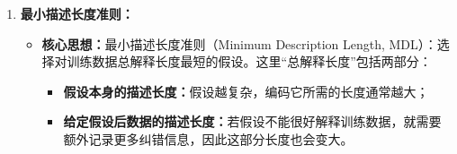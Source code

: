 \documentclass[../main.tex]{subfiles}
\begin{document}
\begin{enumerate}
\begin{itemize}
    {\small\kaishu
    设训练集为
    $$
    D=\{\langle x_1,d_1\rangle,\ldots,\langle x_m,d_m\rangle\}
    $$
    且每个训练值满足
    $$
    d_i=f(x_i)+e_i
    $$
    其中噪声 $e_i$ 相互独立，并服从均值为 $0$、方差为 $\sigma^2$ 的正态分布：
    $$
    e_i\sim N(0,\sigma^2)
    $$
    若各假设先验概率相同，则
    $$
    h_{\mathrm{ML}}=\arg\max_{h\in H}P(D\mid h)
    $$
    由于训练样例相互独立，
    $$
    P(D\mid h)=\prod_{i=1}^{m}p(d_i\mid h)
    $$
    又因为高斯分布下
    $$
    p(d_i\mid h)\propto \exp\!\left(-\frac{(d_i-h(x_i))^2}{2\sigma^2}\right)
    $$
    所以最大化 $P(D\mid h)$ 等价于最小化
    $$
    \sum_{i=1}^{m}(d_i-h(x_i))^2
    $$
    因而
    $$
    h_{\mathrm{ML}}=\arg\min_{h\in H}\sum_{i=1}^{m}(d_i-h(x_i))^2
    $$
    即极大似然假设等价于误差平方和最小的假设。
    }

    \item \textbf{结论二：}若输出是伯努利随机变量，即样本标签服从概率分布，则极大似然假设等价于交叉熵最小化\footnote{这说明交叉熵损失也不是随便定义的；它对应的隐含假设是：对每个输入 $x$，标签 $d\in\{0,1\}$ 服从参数为 $h(x)$ 的伯努利分布，因此神经网络输出的是“属于正类的概率”。}。
    
    {\small\kaishu
    设训练集为
    $$
    D=\{\langle x_1,d_1\rangle,\ldots,\langle x_m,d_m\rangle\},\qquad d_i\in\{0,1\}
    $$
    且训练样例相互独立。设假设 $h(x)$ 表示在输入 $x$ 下输出 $1$ 的概率，则对单个样例有
    $$
    P(d_i\mid h,x_i)=
    \begin{cases}
    h(x_i), & d_i=1\\
    1-h(x_i), & d_i=0
    \end{cases}
    $$
    统一写为
    $$
    P(d_i\mid h,x_i)=h(x_i)^{d_i}(1-h(x_i))^{1-d_i}
    $$
    因此整个训练集的似然为
    $$
    P(D\mid h)=\prod_{i=1}^{m}h(x_i)^{d_i}(1-h(x_i))^{1-d_i}
    $$
    若各假设先验概率相同，则
    $$
    h_{\mathrm{ML}}=\arg\max_{h\in H}P(D\mid h)
    $$
    对似然取对数，可得等价目标
    $$
    \arg\max_{h\in H}\sum_{i=1}^{m}\Bigl[d_i\ln h(x_i)+(1-d_i)\ln\bigl(1-h(x_i)\bigr)\Bigr]
    $$
    因而等价于最小化其相反数
    $$
    -\sum_{i=1}^{m}\Bigl[d_i\ln h(x_i)+(1-d_i)\ln\bigl(1-h(x_i)\bigr)\Bigr]
    $$
    这正是二分类中常用的交叉熵损失。
    }
    \item 使误差平方最小化的法则寻找到极大似然假设的前提是：训练数据可以由目标函数值加上正态分布噪声来模拟
    \item 使交叉熵最小化的法则寻找极大似然假设基于的前提是：观察到的布尔值为输入实例的概率函数
\end{itemize}
\item \textbf{最小描述长度准则：}
\begin{itemize}
    \item \textbf{核心思想：}最小描述长度准则（Minimum Description Length, MDL）：选择对训练数据总解释长度最短的假设。这里“总解释长度”包括两部分：
    \begin{itemize}
        \item \textbf{假设本身的描述长度：}假设越复杂，编码它所需的长度通常越大；
        \item \textbf{给定假设后数据的描述长度：}若假设不能很好解释训练数据，就需要额外记录更多纠错信息，因此这部分长度也会变大。
    \end{itemize}


\end{itemize}
\end{enumerate}
\end{document}
